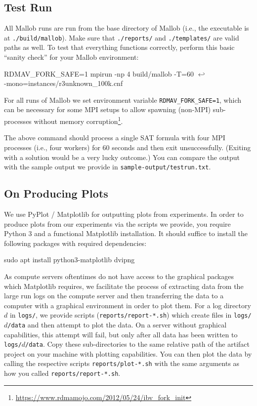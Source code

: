 \documentclass[runningheads]{article}
\newcommand{\CR}{{\tiny$\hookleftarrow$}}
\numberwithin{dummy}{subsection}
\begin{document}
\subsection{Test Run}

All Mallob runs are run from the base directory of Mallob (i.e., the executable is at \texttt{./build/mallob}).
Make sure that \texttt{./reports/} and \texttt{./templates/} are valid paths as well.
To test that everything functions correctly, perform this basic ``sanity check'' for your Mallob environment:

\begin{ttfenv}
RDMAV\_FORK\_SAFE=1 mpirun -np 4 build/mallob -T=60 \CR\\
\hspace*{0.3cm}-mono=instances/r3unknown\_100k.cnf
\end{ttfenv}

For all runs of Mallob we set environment variable \texttt{RDMAV\_FORK\_SAFE=1}, which can be necessary for some MPI setups to allow spawning (non-MPI) sub-processes without memory corruption\footnote{\url{https://www.rdmamojo.com/2012/05/24/ibv_fork_init}}.

The above command should process a single SAT formula with four MPI processes (i.e., four workers) for 60 seconds and then exit unsuccessfully. (Exiting with a solution would be a very lucky outcome.)
You can compare the output with the sample output we provide in \texttt{sample-output/testrun.txt}.

\subsection{On Producing Plots}
\label{sec:plots}

We use PyPlot / Matplotlib for outputting plots from experiments.
In order to produce plots from our experiments via the scripts we provide, you require Python 3 and a functional Matplotlib installation.
It should suffice to install the following packages with required dependencies:

\begin{ttfenv}
sudo apt install python3-matplotlib dvipng
\end{ttfenv}

As compute servers oftentimes do not have access to the graphical packages which Matplotlib requires, we facilitate the process of extracting data from the large run logs on the compute server and then transferring the data to a computer with a graphical environment in order to plot them.
For a log directory $d$ in \texttt{logs/}, we provide scripts (\texttt{reports/report-*.sh}) which create files in \texttt{logs/$d$/data} and then attempt to plot the data.
On a server without graphical capabilities, this attempt will fail, but only after all data has been written to \texttt{logs/$d$/data}.
Copy these sub-directories to the same relative path of the artifact project on your machine with plotting capabilities.
You can then plot the data by calling the respective scripts \texttt{reports/plot-*.sh} with the same arguments as how you called \texttt{reports/report-*.sh}.
\end{document}
